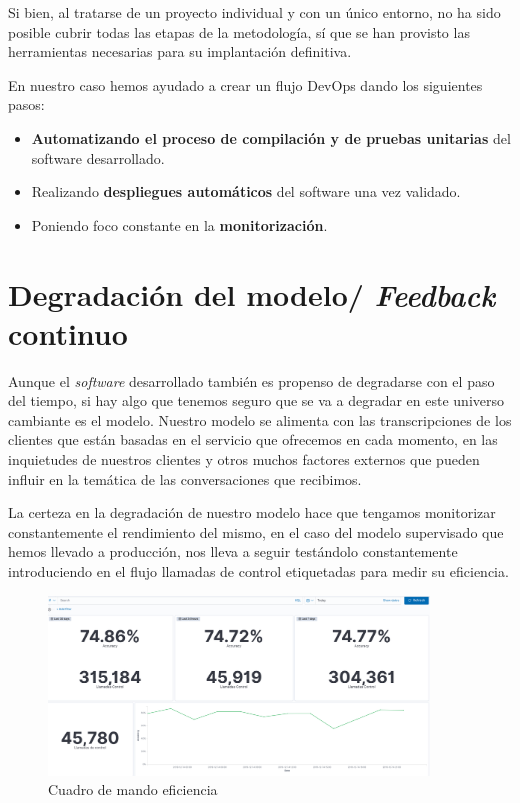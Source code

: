 Si bien, al tratarse de un proyecto individual y con un único entorno, no ha sido posible cubrir todas las etapas de la metodología, sí que se han provisto las herramientas necesarias para su implantación definitiva. 

En nuestro caso hemos ayudado a crear un flujo DevOps dando los siguientes pasos: 

\begin{itemize}
\item\textbf{ Automatizando el proceso de compilación y de pruebas unitarias}  del software desarrollado.
\item Realizando \textbf{despliegues automáticos} del software una vez validado.
\item Poniendo foco constante en la \textbf{monitorización}.
\end{itemize}


\section{Degradación del modelo/ \textit{Feedback} continuo}
\label{section:mant:efi}
Aunque el \textit{software} desarrollado también es propenso de degradarse con el paso del tiempo, si hay algo que tenemos seguro que se va a degradar en este universo cambiante es el modelo. Nuestro modelo se alimenta con las transcripciones de los clientes que están basadas en el servicio que ofrecemos en cada momento, en las inquietudes de nuestros clientes y otros muchos factores externos que pueden influir en la temática de las conversaciones que recibimos.

La certeza en la degradación de nuestro modelo hace que tengamos monitorizar constantemente el rendimiento del mismo, en el caso del modelo supervisado que hemos llevado a producción, nos lleva a seguir testándolo constantemente introduciendo en el flujo llamadas de control etiquetadas para medir su eficiencia.  




\begin{figure}[!ht]
	\centering
	\includegraphics[width=0.9\textwidth]{images/mant/cmeficiencia}
	\caption{Cuadro de mando eficiencia}
	\label{fig:cmeficiencia}
\end{figure}

